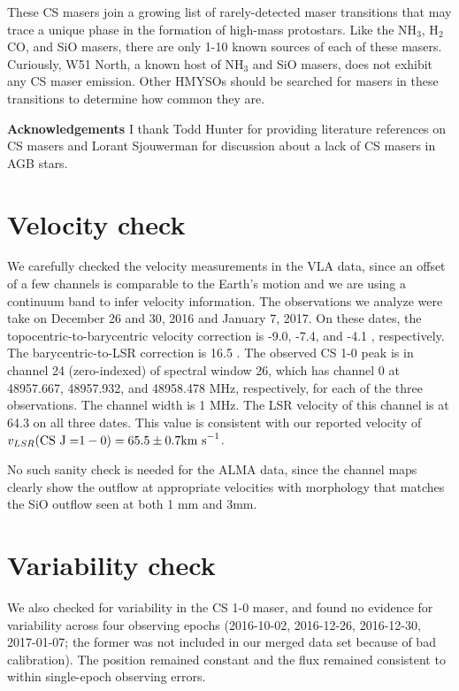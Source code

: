 \documentclass[twocolumn]{aastex62}
\begin{document}
These CS masers join a growing list of rarely-detected maser transitions
that may trace a unique phase in the formation of high-mass protostars.
Like the NH$_3$, H$_2$CO, and SiO masers, there are only 1-10 known sources of
each of these masers.  Curiously, W51 North, a known host of NH$_3$ and SiO masers,
does not exhibit any CS maser emission.  Other HMYSOs should be searched for
masers in these transitions to determine how common they are.

\textbf{Acknowledgements}
I thank Todd Hunter for providing literature references on CS masers and Lorant
Sjouwerman for discussion about a lack of CS masers in AGB stars.

\appendix
\section{Velocity check}
We carefully checked the velocity measurements in the VLA data, since an offset
of a few channels is comparable to the Earth's motion and we are using a
continuum band to infer velocity information.  The observations we analyze were
take on December 26 and 30, 2016 and January 7, 2017.  On these dates, the
topocentric-to-barycentric velocity correction is -9.0, -7.4, and -4.1 \kms,
respectively.  The barycentric-to-LSR correction is 16.5 \kms.  The observed CS
1-0 peak is in channel 24 (zero-indexed) of spectral window 26, which has
channel 0 at  48957.667, 48957.932, and 48958.478 MHz, respectively, for each
of the three observations.  The channel width is 1 MHz.  The LSR velocity of
this channel is at 64.3 \kms on all three dates.  This value is consistent with
our reported velocity of $v_{LSR}(\mathrm{CS~J=}1-0) = 65.5 \pm 0.7 \textrm{km~s}^{-1}$.

No such sanity check is needed for the ALMA data, since the channel maps clearly
show the outflow at appropriate velocities with morphology that matches the SiO
outflow seen at both 1 mm and 3mm.

\section{Variability check}
We also checked for variability in the CS 1-0 maser, and found no evidence for variability
across four observing epochs (2016-10-02, 2016-12-26, 2016-12-30, 2017-01-07; the
former was not included in our merged data set because of bad calibration).
The position remained constant and the flux remained consistent to within single-epoch
observing errors.


\end{document}
